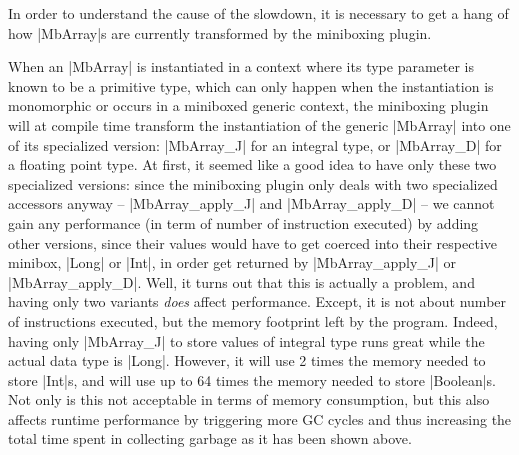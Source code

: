 In order to understand the cause of the slowdown, it is necessary to get a hang of how |MbArray|s are currently transformed by the miniboxing plugin.

When an |MbArray| is instantiated in a context where its type parameter is known to be a primitive type, which can only happen when the instantiation is monomorphic or occurs in a miniboxed generic context, the miniboxing plugin will at compile time transform the instantiation of the generic |MbArray| into one of its specialized version: |MbArray_J| for an integral type, or |MbArray_D| for a floating point type.
At first, it seemed like a good idea to have only these two specialized versions: since the miniboxing plugin only deals with two specialized accessors anyway -- |MbArray_apply_J| and |MbArray_apply_D| -- we cannot gain any performance (in term of number of instruction executed) by adding other versions, since their values would have to get coerced into their respective minibox, |Long| or |Int|, in order get returned by |MbArray_apply_J| or |MbArray_apply_D|.  
Well, it turns out that this is actually a problem, and having only two variants \emph{does} affect performance. Except, it is not about number of instructions executed, but the memory footprint left by the program. Indeed, having only |MbArray_J| to store values of integral type runs great while the actual data type is |Long|. However, it will use 2 times the memory needed to store |Int|s, and will use up to 64 times the memory needed to store |Boolean|s. Not only is this not acceptable in terms of memory consumption, but this also affects runtime performance by triggering more GC cycles and thus increasing the total time spent in collecting garbage as it has been shown above.


